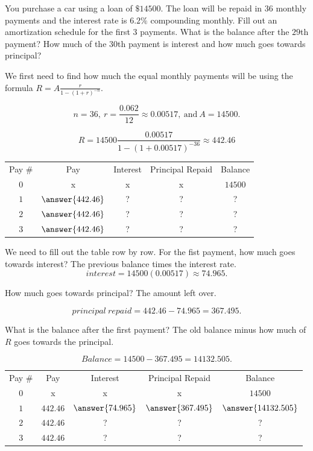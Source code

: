 \begin{problem}
    You purchase a car using a loan of \(\$14500.\) The loan will be repaid in \(36\) monthly payments and the interest rate is \(6.2\%\) compounding monthly. Fill out an amortization schedule for the first \(3\) payments. What is the balance after the \(29\)th payment? How much of the \(30\)th payment is interest and how much goes towards principal?

    We first need to find how much the equal monthly payments will be using the formula \(R = A\frac{r}{1-(1+r)^{-n}}.\)

    \[n=36, \ r = \frac{0.062}{12} \approx 0.00517, \ \textrm{and} \ A = 14500.\]

    \[R = 14500\frac{0.00517}{1-\left(1+0.00517\right)^{-36}} \approx 442.46\]
        \begin{table}[]
    \centering
    \begin{tabular}{c|c|c|c|c}
         Pay \# & Pay & Interest & Principal Repaid & Balance\\
         \(0\) & x & x & x & \(14500\) \\
         \(1\) & \(\answer{442.46}\) & ? & ? & ? \\
         \(2\) & \(\answer{442.46}\) & ? & ? & ?\\
         \(3\) & \(\answer{442.46}\) & ?  & ? & ?
    \end{tabular}
\end{table}
\begin{problem}
    We need to fill out the table row by row. For the fist payment, how much goes towards interest? The previous balance times the interest rate.
    \[interest = 14500(0.00517) \approx 74.965.\]

    How much goes towards principal? The amount left over.

    \[principal \ repaid = 442.46 - 74.965 = 367.495.\]

    What is the balance after the first payment? The old balance minus how much of \(R\) goes towards the principal.

    \[Balance = 14500 - 367.495 = 14132.505.\]

    \begin{tabular}{c|c|c|c|c}
         Pay \# & Pay & Interest & Principal Repaid & Balance\\
         \(0\) & x & x & x & \(14500\) \\
         \(1\) & \(442.46\) & \(\answer{74.965}\) & \(\answer{367.495}\) & \(\answer{14132.505}\) \\
         \(2\) & \(442.46\) & ? & ? & ?\\
         \(3\) & \(442.46\) & ?  & ? & ?
    \end{tabular}


\end{problem}
\end{problem}

